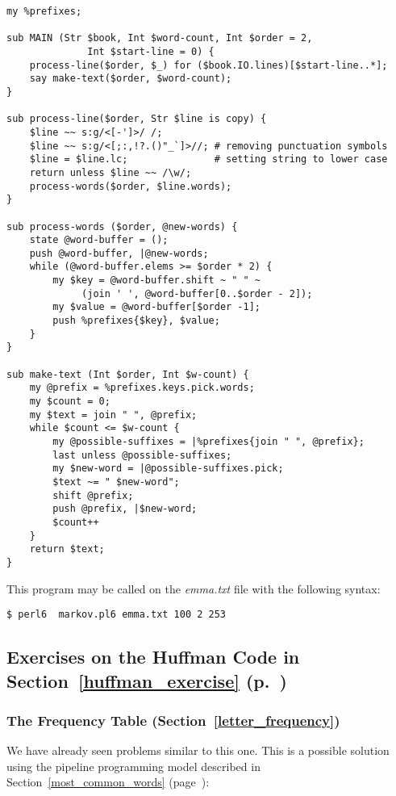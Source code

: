 \begin{verbatim}
my %prefixes;

sub MAIN (Str $book, Int $word-count, Int $order = 2, 
              Int $start-line = 0) {
    process-line($order, $_) for ($book.IO.lines)[$start-line..*]; 
    say make-text($order, $word-count);
}

sub process-line($order, Str $line is copy) {
    $line ~~ s:g/<[-']>/ /; 
    $line ~~ s:g/<[;:,!?.()"_`]>//; # removing punctuation symbols
    $line = $line.lc;               # setting string to lower case
    return unless $line ~~ /\w/;
    process-words($order, $line.words);
}

sub process-words ($order, @new-words) {
    state @word-buffer = ();
    push @word-buffer, |@new-words;
    while (@word-buffer.elems >= $order * 2) {
        my $key = @word-buffer.shift ~ " " ~ 
             (join ' ', @word-buffer[0..$order - 2]);
        my $value = @word-buffer[$order -1];
        push %prefixes{$key}, $value;
    }
}

sub make-text (Int $order, Int $w-count) {
    my @prefix = %prefixes.keys.pick.words;
    my $count = 0;
    my $text = join " ", @prefix;
    while $count <= $w-count {
        my @possible-suffixes = |%prefixes{join " ", @prefix};
        last unless @possible-suffixes;
        my $new-word = |@possible-suffixes.pick;
        $text ~= " $new-word";
        shift @prefix;
        push @prefix, |$new-word;
        $count++
    }
    return $text;
}     
\end{verbatim}

This program may be called on the \emph{emma.txt} file with 
the following syntax:

\begin{verbatim}
$ perl6  markov.pl6 emma.txt 100 2 253
\end{verbatim}

\subsection{Exercises on the Huffman Code in Section~\ref{huffman_exercise} (p.~\pageref{huffman_exercise})}

\subsubsection{The Frequency Table (Section~\ref{letter_frequency})}
\label{sol_letter_frequency}

We have already seen problems similar to this one. This 
is a possible solution using the pipeline programming model 
described in Section~\ref{most_common_words} 
(page~\pageref{most_common_words}):

